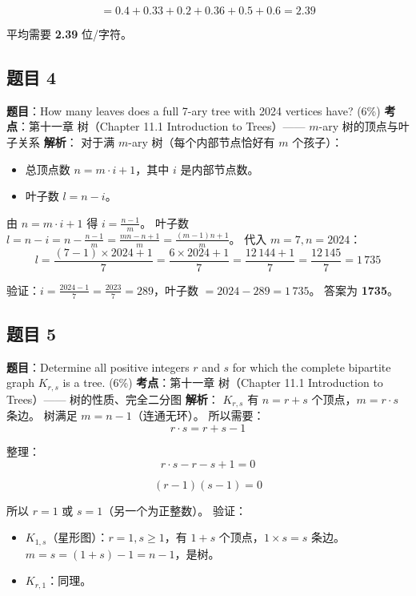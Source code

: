 \documentclass[10pt,a4paper,openany]{ctexbook}
\theoremstyle{definition}
\theoremstyle{remark}
\begin{document}
\[
= 0.4 + 0.33 + 0.2 + 0.36 + 0.5 + 0.6 = 2.39
\]

平均需要 \textbf{2.39} 位/字符。
\vspace{-2pt}

\subsection{题目 4}

\textbf{题目}：How many leaves does a full 7-ary tree with 2024 vertices have? (6\%)
\textbf{考点}：第十一章 树（Chapter 11.1 Introduction to Trees）—— $m$-ary 树的顶点与叶子关系
\textbf{解析}：
对于满 $m$-ary 树（每个内部节点恰好有 $m$ 个孩子）：
\begin{itemize}
\item 总顶点数 $n = m \cdot i + 1$，其中 $i$ 是内部节点数。
\item 叶子数 $l = n - i$。

\end{itemize}

由 $n = m \cdot i + 1$ 得 $i = \frac{n - 1}{m}$。
叶子数 $l = n - i = n - \frac{n - 1}{m} = \frac{mn - n + 1}{m} = \frac{(m-1)n + 1}{m}$。
代入 $m = 7, n = 2024$：
\[
l = \frac{(7-1) \times 2024 + 1}{7} = \frac{6 \times 2024 + 1}{7} = \frac{12\,144 + 1}{7} = \frac{12\,145}{7} = 1\,735
\]

验证：$i = \frac{2024 - 1}{7} = \frac{2023}{7} = 289$，叶子数 $= 2024 - 289 = 1\,735$。
答案为 \textbf{1735}。
\vspace{-2pt}

\subsection{题目 5}

\textbf{题目}：Determine all positive integers $r$ and $s$ for which the complete bipartite graph $K_{r,s}$ is a tree. (6\%)
\textbf{考点}：第十一章 树（Chapter 11.1 Introduction to Trees）—— 树的性质、完全二分图
\textbf{解析}：
$K_{r,s}$ 有 $n = r + s$ 个顶点，$m = r \cdot s$ 条边。
树满足 $m = n - 1$（连通无环）。
所以需要：
\[
r \cdot s = r + s - 1
\]

整理：
\[
r \cdot s - r - s + 1 = 0
\]

\[
(r - 1)(s - 1) = 0
\]

所以 $r = 1$ 或 $s = 1$（另一个为正整数）。
验证：
\begin{itemize}
\item $K_{1,s}$（星形图）：$r=1, s \geq 1$，有 $1+s$ 个顶点，$1 \times s = s$ 条边。$m = s = (1+s) - 1 = n - 1$，是树。
\item $K_{r,1}$：同理。

\end{itemize}
\end{document}
